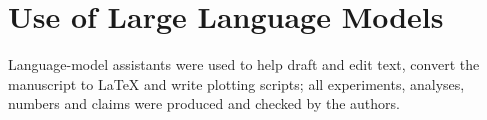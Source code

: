 \section*{Use of Large Language Models}


Language-model assistants were used to help draft and edit text, convert the manuscript to LaTeX and write plotting scripts; all experiments, analyses, numbers and claims were produced and checked by the authors.

